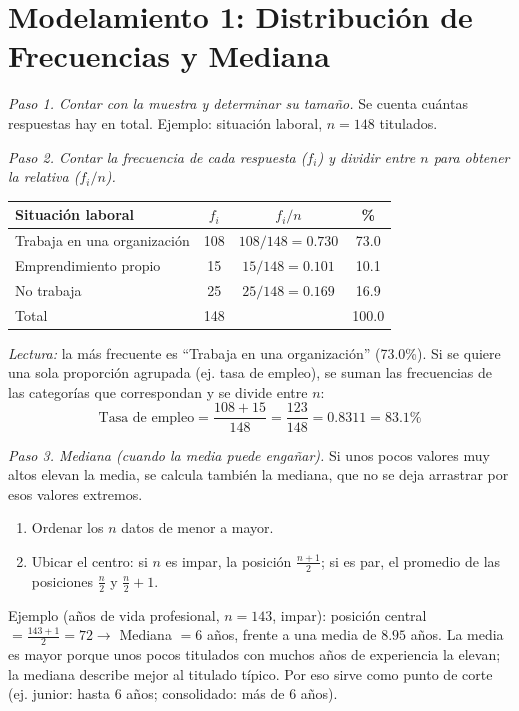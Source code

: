 \documentclass[12pt]{article}
\begin{document}
\section*{Modelamiento 1: Distribución de Frecuencias y Mediana}

\textit{Paso 1. Contar con la muestra y determinar su tamaño.} Se cuenta cuántas respuestas hay en total. Ejemplo: situación laboral, $n=148$ titulados.

\textit{Paso 2. Contar la frecuencia de cada respuesta ($f_i$) y dividir entre $n$ para obtener la relativa ($f_i/n$).}

\begin{tabular}{lccc}
\toprule
Situación laboral & $f_i$ & $f_i/n$ & \% \\
\midrule
Trabaja en una organización & 108 & $108/148=0.730$ & 73.0 \\
Emprendimiento propio & 15 & $15/148=0.101$ & 10.1 \\
No trabaja & 25 & $25/148=0.169$ & 16.9 \\
\midrule
Total & 148 & & 100.0 \\
\bottomrule
\end{tabular}

\textit{Lectura:} la más frecuente es ``Trabaja en una organización'' (73.0\%). Si se quiere una sola proporción agrupada (ej. tasa de empleo), se suman las frecuencias de las categorías que correspondan y se divide entre $n$:
\[
\text{Tasa de empleo} = \frac{108+15}{148} = \frac{123}{148} = 0.8311 = 83.1\%
\]

\textit{Paso 3. Mediana (cuando la media puede engañar).} Si unos pocos valores muy altos elevan la media, se calcula también la mediana, que no se deja arrastrar por esos valores extremos.

\begin{enumerate}
  \item Ordenar los $n$ datos de menor a mayor.
  \item Ubicar el centro: si $n$ es impar, la posición $\frac{n+1}{2}$; si es par, el promedio de las posiciones $\frac{n}{2}$ y $\frac{n}{2}+1$.
\end{enumerate}

Ejemplo (años de vida profesional, $n=143$, impar): posición central $=\frac{143+1}{2}=72 \rightarrow$ Mediana $=6$ años, frente a una media de $8.95$ años. La media es mayor porque unos pocos titulados con muchos años de experiencia la elevan; la mediana describe mejor al titulado típico. Por eso sirve como punto de corte (ej. junior: hasta 6 años; consolidado: más de 6 años).
\end{document}
